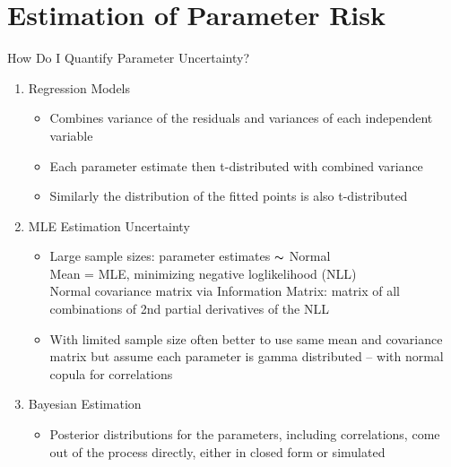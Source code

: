 \documentclass[10pt, xcolor=x11names, compress, handout]{beamer}
\begin{document}
\section{Estimation of Parameter Risk}
\begin{frame}{How Do I Quantify Parameter Uncertainty?}
	\begin{enumerate}
		\item<1-> Regression Models
		\begin{itemize}
			\item<1-> Combines variance of the residuals and variances of each independent variable
			\item<1-> Each parameter estimate then t-distributed with combined variance
			\item<1-> Similarly the distribution of the fitted points is also t-distributed
		\end{itemize}
		
		\item<2-> MLE Estimation Uncertainty
		\begin{itemize}
			\item<2-> Large sample sizes: parameter estimates $\thicksim$ Normal\\
				Mean = MLE, minimizing negative loglikelihood (NLL)\\
				Normal covariance matrix via Information Matrix: matrix of all combinations of 2nd partial derivatives of the NLL	
			\item<2-> With limited sample size often better to use same mean and covariance matrix but assume each parameter is gamma distributed -- with normal copula for correlations
		\end{itemize}	
		
			\item<3-> Bayesian Estimation
					\begin{itemize}
			\item<3-> Posterior distributions for the parameters, including correlations, come out of the process directly, either in closed form or simulated
		\end{itemize}	


	\end{enumerate}
\end{frame}

\end{document}
